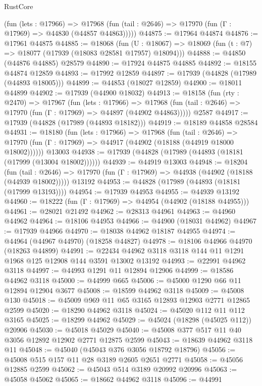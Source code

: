 \begin{lexlean}{RustCore}
\begin{coremodule}
      (fun (lets : @17966) =>
      @17968 (fun (tail : @2646) => @17970 (fun (Γ : @17969) => @44830 (@44857 @44863)))))
@44875 := @17964 @44874
@44876 := @17961 @44875
@44885 := @18068
    (fun (U : @18067) => @18069 (fun (t : @7) => @18077 (@17939 (@18083 @28581 @17957) @18094)))
@44888 := @44850 (@44876 @44885) @28579
@44890 := @17924 @44875 @44885
@44892 := @18155 @44874 @12859
@44893 := @17992 @12859
@44897 := @17939 (@44828 (@17989 (@44893 @18005)))
@44899 := @44853 (@18027 @12859)
@44900 := @18011 @44899
@44902 := @17939 (@44900 @18032)
@44913 := @18158
    (fun (rty : @2470) =>
    @17967
      (fun (lets : @17966) =>
      @17968 (fun (tail : @2646) => @17970 (fun (Γ : @17969) => @44897 (@44902 @44863)))))
    @2587
@44917 := @17939 (@44828 (@17989 (@44893 @18182)))
@44919 := @18189 @44858 @28584
@44931 := @18180
    (fun (lets : @17966) =>
    @17968
      (fun (tail : @2646) =>
      @17970 (fun (Γ : @17969) => @44917 (@44902 (@18188 (@44919 @18000 @18002))))))
    @13003
@44938 := @17939 (@44828 (@17989 (@44893 (@18181 (@17999 (@13004 @18002))))))
@44939 := @44919 @13003
@44948 := @18204
    (fun (tail : @2646) => @17970 (fun (Γ : @17969) => @44938 (@44902 (@18188 (@44939 @18002)))))
    @13192
@44953 := @44828 (@17989 (@44893 (@18181 (@17999 @13193))))
@44954 := @17939 @44953
@44955 := @44939 @13192
@44960 := @18222 (fun (Γ : @17969) => @44954 (@44902 (@18188 @44955)))
@44961 := @28021 @21492
@44962 := @28313 @44961
@44963 := @44960 @44962
@44964 := @18106 @44953
@44966 := @44900 (@18031 @44962)
@44967 := @17939 @44966
@44970 := @18038 @44962 @18187 @44955
@44974 := @44964 (@44967 @44970) (@18258 @44827)
@44978 := @18106 @44966 @44970 (@18263 @44899)
@44991 := @22434 @44962 @3118 @3118 @144 @11 @1291 @1968 @125 @12908 @144 @3591 @13002 @13192
@44993 := @22991 @44962 @3118
@44997 := @44993 @1291 @11 @12894 @12906
@44999 := @18586 @44962 @3118
@45000 := @44999 @665
@45006 := @45000 @1290 @66 @11 @12894 @12904 @3677
@45008 := @18599 @44962 @3118
@45009 := @45008 @130
@45018 := @45009 @969 @11 @65 @3165 @12893 @12903 @2771 @12865 @2599
@45020 := @18290 @44962 @3118
@45024 := @45020 @112 @11 @112 @3165
@45025 := @18299 @44962
@45029 := @45024 (@18298 (@45025 @112)) @20906
@45030 := @45018 @45029
@45040 := @45008 @377 @517 @11 @40 @3056 @12892 @12902 @2771 @12875 @2599
@45043 := @18639 @44962 @3118 @11
@45048 := @45040 (@45043 @376 @3056 @18792 @18796)
@45056 := @45008 @515 @157 @11 @28 @3189 @2605 @2651 @2771
@45058 := @45056 @12885 @2599
@45062 := @45043 @514 @3189 @20992 @20996
@45063 := @45058 @45062
@45065 := @18662 @44962 @3118
@45096 := @44991

\end{coremodule}
\end{lexlean}
